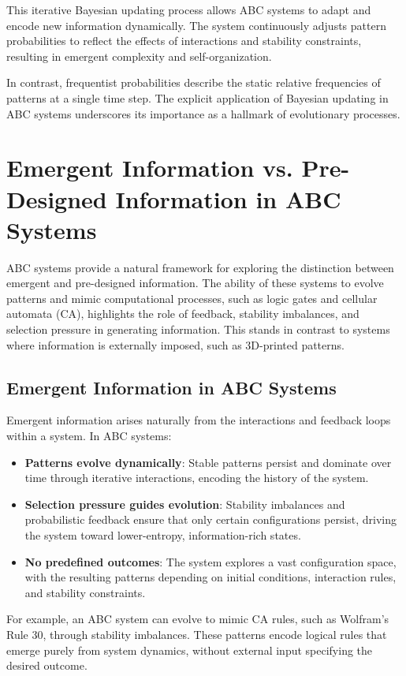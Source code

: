 \documentclass[entropy,article,submit,pdftex,moreauthors]{Definitions/mdpi}
\begin{document}
This iterative Bayesian updating process allows ABC systems to adapt and encode new information dynamically. The system continuously adjusts pattern probabilities to reflect the effects of interactions and stability constraints, resulting in emergent complexity and self-organization.

In contrast, frequentist probabilities describe the static relative frequencies of patterns at a single time step. The explicit application of Bayesian updating in ABC systems underscores its importance as a hallmark of evolutionary processes.

\section{Emergent Information vs. Pre-Designed Information in ABC Systems}

ABC systems provide a natural framework for exploring the distinction between emergent and pre-designed information. The ability of these systems to evolve patterns and mimic computational processes, such as logic gates and cellular automata (CA), highlights the role of feedback, stability imbalances, and selection pressure in generating information. This stands in contrast to systems where information is externally imposed, such as 3D-printed patterns.

\subsection{Emergent Information in ABC Systems}

Emergent information arises naturally from the interactions and feedback loops within a system. In ABC systems:
\begin{itemize}
    \item \textbf{Patterns evolve dynamically}: Stable patterns persist and dominate over time through iterative interactions, encoding the history of the system.
    \item \textbf{Selection pressure guides evolution}: Stability imbalances and probabilistic feedback ensure that only certain configurations persist, driving the system toward lower-entropy, information-rich states.
    \item \textbf{No predefined outcomes}: The system explores a vast configuration space, with the resulting patterns depending on initial conditions, interaction rules, and stability constraints.
\end{itemize}
For example, an ABC system can evolve to mimic CA rules, such as Wolfram’s Rule 30, through stability imbalances. These patterns encode logical rules that emerge purely from system dynamics, without external input specifying the desired outcome.
\end{document}
